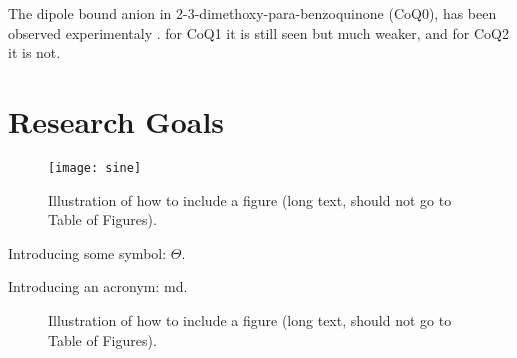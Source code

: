 The dipole bound anion in 2-3-dimethoxy-para-benzoquinone (CoQ0), has been observed experimentaly \cite{ameixa2023parent,west2014anion,pshenichnyuk2020ionizing, bull2015anion}. for CoQ1 it is still seen but much weaker, and for CoQ2 it is not. 

\section{Research Goals}

\begin{figure}[th!]
  \centering
  \medskip
  \texttt{[image: sine]}
  \caption[Short caption for Table of Figures]{Illustration of how to
  include a figure (long text, should not go to Table of Figures).}
  \label{fig:sine}
\end{figure}

Introducing some symbol: $\Theta$.

Introducing an acronym: \gls{md}.

\begin{figure}[th!]
  \centering
  
  \caption[Short caption for Table of Figures]{Illustration of how to
  include a figure (long text, should not go to Table of Figures).}
  \label{fig:test}
\end{figure}

\cleardoublepage

